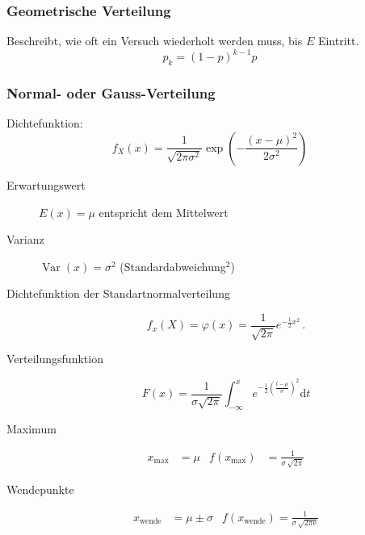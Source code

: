 \subsubsection{Geometrische Verteilung}
Beschreibt, wie oft ein Versuch wiederholt werden muss, bis $E$ Eintritt.
\begin{equation*}
	p_k = (1 - p)^{k-1} p
\end{equation*}

\subsubsection{Normal- oder Gauss-Verteilung}
Dichtefunktion:
\begin{equation*}
	f_X(x) = \frac{1}{\sqrt{2\pi\sigma^2}}\operatorname{exp}\left(-\frac{\left(x-\mu\right)^2}{2\sigma^2}\right)
\end{equation*}
\begin{description}
	\item [Erwartungswert] $E(x) = \mu$ entspricht dem Mittelwert
	
	\item [Varianz] $\operatorname{Var}(x) = \sigma^2$ (Standardabweichung$^2$)
	
	\item [Dichtefunktion der Standartnormalverteilung]
	\begin{equation*}
		f_x(X) = \varphi(x)=\frac{1}{\sqrt{2\pi}}  e^{-\frac{1}{2} x^2}\,.
	\end{equation*}
	
	\item [Verteilungsfunktion]
	\begin{equation*}
		F(x) = \frac{1}{\sigma\sqrt{2\pi}} \int_{-\infty}^x e^{-\frac{1}{2} \left(\frac{t-\mu}{\sigma}\right)^2} \mathrm dt
	\end{equation*}

	\item [Maximum]
	\begin{align*}
		x_{\mbox{max}}& = \mu & f(x_{\mbox{max}})& = \frac{1}{\sigma\,\sqrt{2\pi}}
	\end{align*}

	\item [Wendepunkte]
	\begin{align*}
		x_{\mbox{wende}}& = \mu \pm \sigma & f(x_{\mbox{wende}}) = \frac{1}{\sigma\,\sqrt{2\pi \mathrm e}}
	\end{align*}
\end{description}

